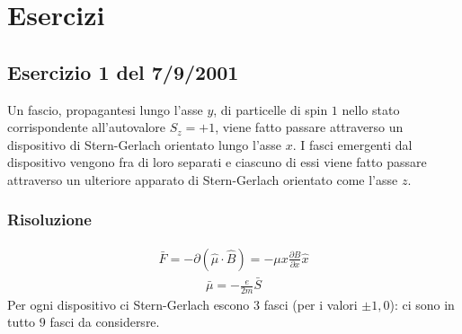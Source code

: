 \chapter{Esercizi} %
\section{Esercizio 1 del 7/9/2001} %
Un fascio, propagantesi lungo l'asse $y$, di particelle di spin $1$ nello stato corrispondente all'autovalore $S_z=+1$, viene fatto passare attraverso un dispositivo di Stern-Gerlach orientato lungo l'asse $x$. I fasci emergenti dal dispositivo vengono fra di loro separati e ciascuno di essi viene fatto passare attraverso un ulteriore apparato di Stern-Gerlach orientato come l'asse $z$.

\subsection{Risoluzione} %
\begin{equation}\begin{split}
\bar F=-\partial \left(\hat \mu\cdot \hat B\right)=-\mu x \frac{\partial B}{\partial x}\hat x
\end{split}\end{equation}
\begin{equation}\begin{split}
\bar \mu=-\frac{e}{2m}\bar S
\end{split}\end{equation}
Per ogni dispositivo ci Stern-Gerlach escono $3$ fasci (per i valori $\pm 1, 0$): ci sono in tutto $9$ fasci da considersre.

